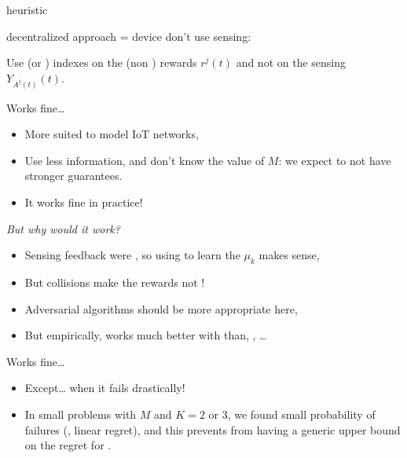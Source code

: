 \documentclass[12pt,english,ignorenonframetext,aspectratio=169,]{beamer}
\providecommand{\tightlist}{%
  \setlength{\itemsep}{0pt}\setlength{\parskip}{0pt}}
\begin{document}
\begin{frame}[allowframebreaks]{\Selfish{} heuristic}

\Selfish{} decentralized approach = device don't use sensing:

\begin{block}{\Selfish}
  Use \UCB{} (or \klUCB) indexes on the (non \iid) rewards \(r^j(t)\)
  and not on the sensing $Y_{A^j(t)}(t)$.
\end{block}

\begin{block}{Works fine\ldots{}}

\begin{itemize}\tightlist
\item
  More suited to model IoT networks,
\item
  Use less information, and don't know the value of \(M\): we expect
  \Selfish{} to not have stronger guarantees.
\item
  It works fine in practice!
\end{itemize}

\end{block}

\begin{block}{\emph{But why would it work?}}

\begin{itemize}\tightlist
\item
  Sensing feedback were \iid, so using \UCB{} to learn the \(\mu_k\) makes sense,
\item
  But collisions make the rewards not \iid{} !
\item
  Adversarial algorithms should be more appropriate here,
\item
  But empirically, \Selfish{} works much better with \klUCB{}
  than, \eg, \ExpThree\ldots{}
\end{itemize}

\end{block}

\begin{block}{Works fine\ldots{}}

\begin{itemize}\tightlist
\item
  Except\ldots{} when it fails drastically! \Sadey[1.3]
\item
  In small problems with \(M\) and \(K = 2\) or \(3\), we found small
  probability of failures (\ie, linear regret), and this prevents from
  having a generic upper bound on the regret for \Selfish.
\end{itemize}

\end{block}

\end{frame}
\end{document}
